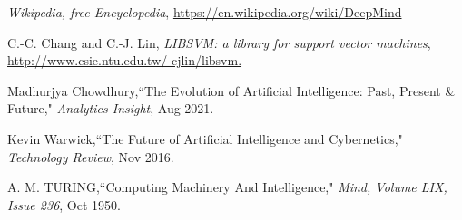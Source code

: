 \documentclass[12pt]{article}
\begin{document}
\begin{thebibliography}{10}
 \emph{Wikipedia, free Encyclopedia}, \url{https://en.wikipedia.org/wiki/DeepMind}

 C.-C. Chang and C.-J. Lin, \emph{LIBSVM: a library for
support vector machines}, \url{http://www.csie.ntu.edu.tw/ cjlin/libsvm.}

 Madhurjya Chowdhury,``The Evolution of Artificial Intelligence: Past, Present \& Future," \emph{Analytics Insight}, Aug 2021.

 Kevin Warwick,``The Future of Artificial Intelligence and Cybernetics," \emph{Technology Review}, Nov 2016.

 A. M. TURING,``Computing Machinery And Intelligence," \emph{Mind, Volume LIX, Issue 236}, Oct 1950.

\end{thebibliography}
\end{document}
